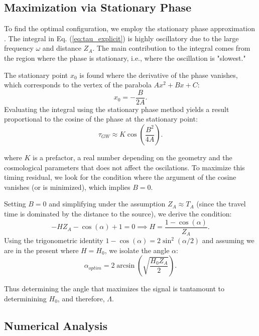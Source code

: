 \documentclass[twocolumn]{revtex4-2}
\begin{document}
\subsection{Maximization via Stationary Phase}
To find the optimal configuration, we employ the stationary phase approximation \cite{ArfkenWeber}. The integral in Eq. (\ref{eq:tau_explicit}) is highly oscillatory due to the large frequency $\omega$ and distance $Z_A$. The main contribution to the integral comes from the region where the phase is stationary, i.e., where the oscillation is "slowest."

The stationary point $x_0$ is found where the derivative of the phase vanishes, which corresponds to the vertex of the parabola $Ax^2 + Bx + C$:
\begin{equation}
x_0 = -\frac{B}{2A}.
\end{equation}
Evaluating the integral using the stationary phase method yields a result proportional to the cosine of the phase at the stationary point:
\begin{equation}
\tau_{GW} \approx K \cos\left( \frac{B^2}{4A} \right).
\end{equation}

\noindent where $K$ is a prefactor, a real number depending on the geometry and the cosmological parameters that does not affect the oscilations.
To maximize this timing residual, we look for the condition where the argument of the cosine vanishes (or is minimized), which implies $B=0$. 

Setting $B=0$ and simplifying under the assumption $Z_A \approx T_A$ (since the travel time is dominated by the distance to the source), we derive the condition:
\begin{equation}
-H Z_A - \cos(\alpha) + 1 = 0 \implies H = \frac{1 - \cos(\alpha)}{Z_A}.
\end{equation}
Using the trigonometric identity $1 - \cos(\alpha) = 2 \sin^2(\alpha/2)$ and assuming we are in the present where $H=H_0$, we isolate the angle $\alpha$:
\begin{equation}
\alpha_{optim} = 2 \arcsin \left( \sqrt{\frac{H_0 Z_A}{2}} \right).
\label{eq:alpha_optim}
\end{equation}

Thus determining the angle that maximizes the signal is tantamount to determinining $H_0$, and therefore, $\Lambda$.


\subsection{Numerical Analysis}
\end{document}
